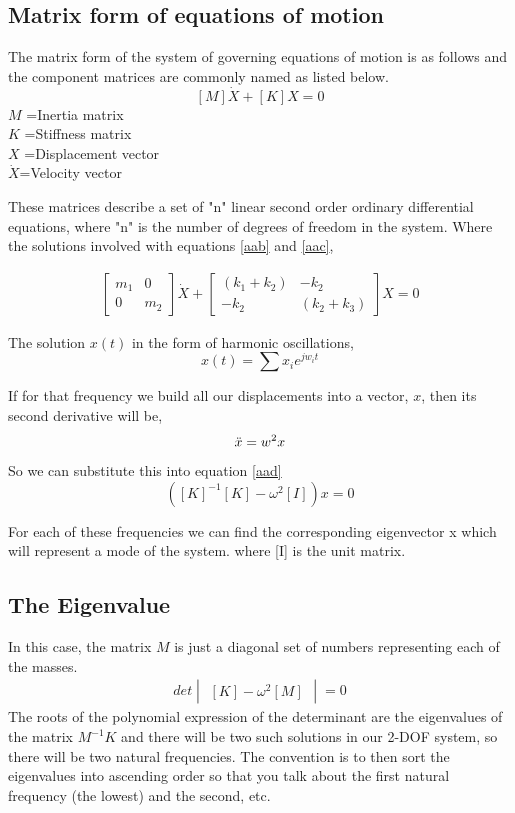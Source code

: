 \documentclass[extendedabs]{AAVL}
\begin{document}
\subsection{Matrix form of equations of motion}
The matrix form of the system of governing equations of motion is as follows and the component matrices are commonly named as listed below.
\begin{equation}
\label{aad}
    [M]{\dot{X}}+[K]{X} = 0
\end{equation}
$M$ =Inertia matrix \\
$K$ =Stiffness matrix\\
$X$ =Displacement vector\\
$\dot{X}$=Velocity vector

These matrices describe a set of "n" linear second order ordinary differential equations, where "n" is the number of degrees of freedom in the system. Where the solutions involved with equations \eqref{aab} and \eqref{aac},

\begin{gather}
    \begin{bmatrix}
m_1 & 0\\0& m_2 
\end{bmatrix}{\dot{X}} +
\begin{bmatrix}
(k_1+k_2)&-k_2\\-k_2&(k_2+k_3)
\end{bmatrix}{X} = 0
\end{gather}

The solution $x(t)$ in the form of harmonic oscillations,
\begin{equation}
    x(t) = \sum x_ie^{jw_it}
\end{equation}

If for that frequency we build all our displacements into a vector, ${x}$, then its second derivative will be,
\begin{equation}
    {\Ddot{x}} = w^2{x}
\end{equation}
So we can substitute this into equation \eqref{aad}
\begin{equation}
    ([K]^{-1}[K] -\omega^2[I]){x} = 0
\end{equation}

For each of these frequencies we can find the corresponding eigenvector {x} which will represent a mode of the system. where [I] is the unit matrix.

\subsection{The Eigenvalue}
In this case, the matrix $M$ is just a diagonal set of numbers representing each of the masses.
\begin{gather}
    det\begin{vmatrix}
    [K]-\omega^2[M]
    \end{vmatrix}=0
\end{gather}
The roots of the polynomial expression of the determinant are the  eigenvalues of the matrix $M^{-1}K$ and there will be two such solutions in our 2-DOF system, so there will be two natural frequencies. The convention is to then sort the eigenvalues into ascending order so that you talk about the first natural frequency (the lowest) and the second, etc.
\end{document}
